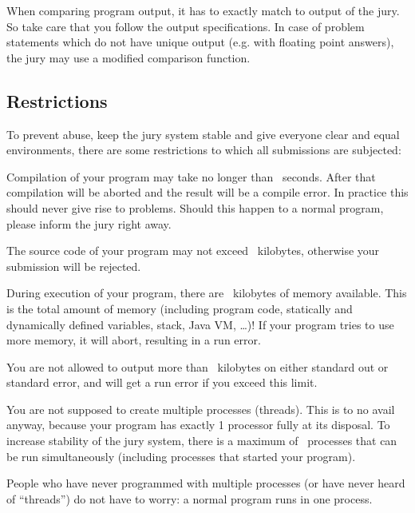 When comparing program output, it has to exactly match to output of
the jury. So take care that you follow the output specifications. In
case of problem statements which do not have unique output (e.g. with
floating point answers), the jury may use a modified comparison
function.

\subsection{Restrictions}\label{runlimits}

To prevent abuse, keep the jury system stable and give everyone
clear and equal environments, there are some restrictions to which all
submissions are subjected:

\begin{description}
\item[compile time]
Compilation of your program may take no longer than \COMPILETIME\
seconds. After that compilation will be aborted and the result will
be a compile error. In practice this should never give rise to
problems. Should this happen to a normal program, please inform the
jury right away.

\item[source size]
The source code of your program may not exceed \SOURCESIZE\ kilobytes,
otherwise your submission will be rejected.

\item[memory]
During execution of your program, there are \MEMLIMIT\ kilobytes of
memory available. This is the total amount of memory (including
program code, statically and dynamically defined variables, stack,
Java VM, \dots)! If your program tries to use more memory, it will
abort, resulting in a run error.

\item[program output]
You are not allowed to output more than \FILELIMIT\ kilobytes
on either standard out or standard error, and will get a run error
if you exceed this limit.

\item[number of processes]
You are not supposed to create multiple processes (threads). This is
to no avail anyway, because your program has exactly 1 processor fully
at its disposal. To increase stability of the jury system, there is a
maximum of \PROCLIMIT\ processes that can be run simultaneously
(including processes that started your program).

People who have never programmed with multiple processes (or have
never heard of ``threads'') do not have to worry: a normal program
runs in one process.

\end{description}

